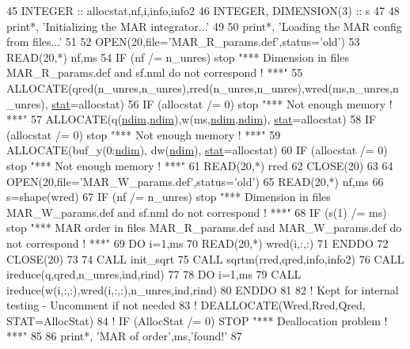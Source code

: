 \begin{DoxyCode}
45     \textcolor{keywordtype}{INTEGER} :: allocstat,nf,i,info,info2
46     \textcolor{keywordtype}{INTEGER}, \textcolor{keywordtype}{DIMENSION(3)} :: s
47 
48     print*, \textcolor{stringliteral}{'Initializing the MAR integrator...'}
49 
50     print*, \textcolor{stringliteral}{'Loading the MAR config from files...'}
51 
52     \textcolor{keyword}{OPEN}(20,file=\textcolor{stringliteral}{'MAR\_R\_params.def'},status=\textcolor{stringliteral}{'old'})
53     \textcolor{keyword}{READ}(20,*) nf,ms
54     \textcolor{keywordflow}{IF} (nf /= n\_unres) stop \textcolor{stringliteral}{"*** Dimension in files MAR\_R\_params.def and sf.nml do not correspond ! ***"}
55     \textcolor{keyword}{ALLOCATE}(qred(n\_unres,n\_unres),rred(n\_unres,n\_unres),wred(ms,n\_unres,n\_unres), 
      \hyperlink{namespacestat}{stat}=allocstat)
56     \textcolor{keywordflow}{IF} (allocstat /= 0) stop \textcolor{stringliteral}{"*** Not enough memory ! ***"}
57     \textcolor{keyword}{ALLOCATE}(q(\hyperlink{namespaceparams_a2323fe1773f086e20c14f266351c482b}{ndim},\hyperlink{namespaceparams_a2323fe1773f086e20c14f266351c482b}{ndim}),w(ms,\hyperlink{namespaceparams_a2323fe1773f086e20c14f266351c482b}{ndim},\hyperlink{namespaceparams_a2323fe1773f086e20c14f266351c482b}{ndim}), \hyperlink{namespacestat}{stat}=allocstat)
58     \textcolor{keywordflow}{IF} (allocstat /= 0) stop \textcolor{stringliteral}{"*** Not enough memory ! ***"}
59     \textcolor{keyword}{ALLOCATE}(buf\_y(0:\hyperlink{namespaceparams_a2323fe1773f086e20c14f266351c482b}{ndim}), dw(\hyperlink{namespaceparams_a2323fe1773f086e20c14f266351c482b}{ndim}), \hyperlink{namespacestat}{stat}=allocstat)
60     \textcolor{keywordflow}{IF} (allocstat /= 0) stop \textcolor{stringliteral}{"*** Not enough memory ! ***"}
61     \textcolor{keyword}{READ}(20,*) rred
62     \textcolor{keyword}{CLOSE}(20)
63     
64     \textcolor{keyword}{OPEN}(20,file=\textcolor{stringliteral}{'MAR\_W\_params.def'},status=\textcolor{stringliteral}{'old'})
65     \textcolor{keyword}{READ}(20,*) nf,ms
66     s=shape(wred)
67     \textcolor{keywordflow}{IF} (nf /= n\_unres) stop \textcolor{stringliteral}{"*** Dimension in files MAR\_W\_params.def and sf.nml do not correspond ! ***"}
68     \textcolor{keywordflow}{IF} (s(1) /= ms) stop \textcolor{stringliteral}{"*** MAR order in files MAR\_R\_params.def and MAR\_W\_params.def do not correspond !
       ***"}
69     \textcolor{keywordflow}{DO} i=1,ms
70        \textcolor{keyword}{READ}(20,*) wred(i,:,:)
71 \textcolor{keywordflow}{    ENDDO}
72     \textcolor{keyword}{CLOSE}(20)
73 
74     \textcolor{keyword}{CALL }init\_sqrt
75     \textcolor{keyword}{CALL }sqrtm(rred,qred,info,info2)
76     \textcolor{keyword}{CALL }ireduce(q,qred,n\_unres,ind,rind)
77     
78     \textcolor{keywordflow}{DO} i=1,ms
79        \textcolor{keyword}{CALL }ireduce(w(i,:,:),wred(i,:,:),n\_unres,ind,rind)
80 \textcolor{keywordflow}{    ENDDO}
81     
82     \textcolor{comment}{! Kept for internal testing - Uncomment if not needed}
83     \textcolor{comment}{! DEALLOCATE(Wred,Rred,Qred, STAT=AllocStat)}
84     \textcolor{comment}{! IF (AllocStat /= 0) STOP "*** Deallocation problem ! ***"}
85 
86     print*, \textcolor{stringliteral}{'MAR of order'},ms,\textcolor{stringliteral}{'found!'}
87     
\end{DoxyCode}
